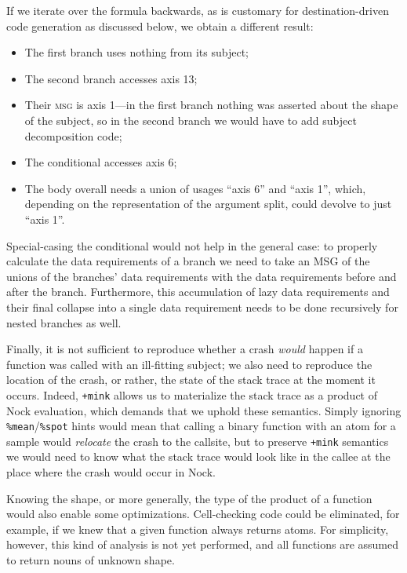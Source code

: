 \documentclass[twoside]{article}
\begin{document}
If we iterate over the formula backwards, as is customary for destination-driven code generation \citep{ddcg} as discussed below, we obtain a different result:

\begin{itemize}
  \item  The first branch uses nothing from its subject;
  \item  The second branch accesses axis 13;
  \item  Their \textsc{msg} is axis 1---in the first branch nothing was asserted about the shape of the subject, so in the second branch we would have to add subject decomposition code;
  \item  The conditional accesses axis 6;
  \item  The body overall needs a union of usages ``axis 6'' and ``axis 1'', which, depending on the representation of the argument split, could devolve to just ``axis 1''.
\end{itemize}

Special-casing the conditional would not help in the general case: to properly calculate the data requirements of a branch we need to take an MSG of the unions of the branches' data requirements with the data requirements before and after the branch. Furthermore, this accumulation of lazy data requirements and their final collapse into a single data requirement needs to be done recursively for nested branches as well.

Finally, it is not sufficient to reproduce whether a crash \emph{would} happen if a function was called with an ill-fitting subject; we also need to reproduce the location of the crash, or rather, the state of the stack trace at the moment it occurs. Indeed, \lstinline[style=inlinecode]{+mink} allows us to materialize the stack trace as a product of Nock evaluation, which demands that we uphold these semantics. Simply ignoring \lstinline[style=inlinecode]{%mean}/\lstinline[style=inlinecode]{%spot} hints would mean that calling a binary function with an atom for a sample would \emph{relocate} the crash to the callsite, but to preserve \lstinline[style=inlinecode]{+mink} semantics we would need to know what the stack trace would look like in the callee at the place where the crash would occur in Nock.

Knowing the shape, or more generally, the type of the product of a function would also enable some optimizations. Cell-checking code could be eliminated, for example, if we knew that a given function always returns atoms. For simplicity, however, this kind of analysis is not yet performed, and all functions are assumed to return nouns of unknown shape.
\end{document}
